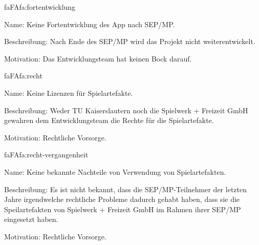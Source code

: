 \setcounter{fa}{10}

\begin{description}[leftmargin=5em, style=sameline]
	
	\begin{lhp}{fa}{FA}{fa:fortentwicklung}
		\item [Name:] Keine Fortentwicklung des App nach SEP/MP.
		\item [Beschreibung:] Nach Ende des SEP/MP wird das Projekt nicht weiterentwickelt.
		\item [Motivation:] Das Entwicklungsteam hat keinen Bock darauf.
	\end{lhp}
	
	\begin{lhp}{fa}{FA}{fa:recht}
		\item [Name:] Keine Lizenzen für Spielartefakte.
		\item [Beschreibung:] Weder TU Kaiserslautern noch die Spielwerk + Freizeit GmbH gewahren dem Entwicklungsteam die Rechte für die Spielartefakte.
		\item [Motivation:] Rechtliche Vorsorge.
	\end{lhp}
	
	\begin{lhp}{fa}{FA}{fa:recht-vergangenheit}
		\item [Name:] Keine bekannte Nachteile von Verwendung von Spielartefakten.
		\item [Beschreibung:] Es ist nicht bekannt, dass die SEP/MP-Teilnehmer der letzten Jahre irgendwelche rechtliche Probleme dadurch gehabt haben, dass sie die Speilartefakten von Spielwerk + Freizeit GmbH im Rahmen ihrer SEP/MP eingesetzt haben.
		\item [Motivation:] Rechtliche Vorsorge.
	\end{lhp}
	
	
\end{description}

